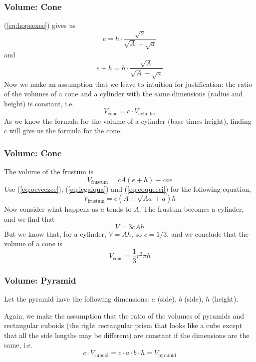 \documentclass[xcolor=dvipsnames]{beamer}
\begin{document}
\begin{frame}
  \frametitle{Volume: Cone}
  (\ref{eq:hopeexee}) gives us
  \begin{equation}
    \label{eq:iegaiqua}
    e=h\cdot\frac{\sqrt{a}}{\sqrt{A}-\sqrt{a}}
  \end{equation}
  and
  \begin{equation}
    \label{eq:eoqueeci}
    e+h=h\cdot\frac{\sqrt{A}}{\sqrt{A}-\sqrt{a}}
  \end{equation}
Now we make an assumption that we leave to intuition for
justification: the ratio of the volumes of a cone and a cylinder with
the same dimensions (radius and height) is constant, i.e.
\begin{equation}
  \label{eq:aixiiyee}
  V_{\mbox{cone}}=c\cdot{}V_{\mbox{cylinder}}
\end{equation}
As we know the formula for the volume of a cylinder (base times
height), finding $c$ will give us the formula for the cone.
  \end{frame}

\begin{frame}
  \frametitle{Volume: Cone}
  The volume of the frustum is
  \begin{equation}
    \label{eq:ailaecho}
  V_{\mbox{frustum}}=cA(e+h)-cae
  \end{equation}
  Use (\ref{eq:oeveezee}), (\ref{eq:iegaiqua}) and (\ref{eq:eoqueeci})
  for the following equation,
\begin{equation}
  \label{eq:ohchoomu}
  V_{\mbox{frustum}}=c(A+\sqrt{Aa}+a)h
\end{equation}
Now consider what happens as $a$ tends to $A$. The frustum becomes a cylinder,
and we find that
\begin{equation}
  \label{eq:uuchiroo}
  V=3cAh
\end{equation}
But we know that, for a cylinder, $V=Ah$, so $c=1/3$, and we conclude
that the volume of a cone is
\begin{equation}
  \label{eq:wutaecah}
  V_{\mbox{cone}}=\frac{1}{3}r^{2}\pi{}h
\end{equation}
\end{frame}

\begin{frame}
  \frametitle{Volume: Pyramid}
  Let the pyramid have the following dimensions: $a$ (side), $b$
  (side), $h$ (height).

\bigskip

Again, we make the assumption that the ratio of the volumes of
pyramids and rectangular cuboids (the right rectangular prism that
looks like a cube except that all the side lengths may be different)
are constant if the dimensions are the same, i.e.
\begin{equation}
  \label{eq:aetoowek}
  c\cdot{}V_{\mbox{cuboid}}=c\cdot{}a\cdot{}b\cdot{}h=V_{\mbox{pyramid}}
\end{equation}
\end{frame}
\end{document}
